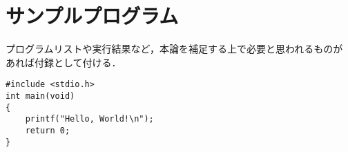 \documentclass[11pt]{jreport}
\begin{document}

\appendix

\chapter{サンプルプログラム}

プログラムリストや実行結果など，本論を補足する上で必要と思われるものが
あれば付録として付ける．

{
\footnotesize
\begin{verbatim}
#include <stdio.h>
int main(void)
{
    printf("Hello, World!\n");
    return 0;
}
\end{verbatim}
}

\end{document}
